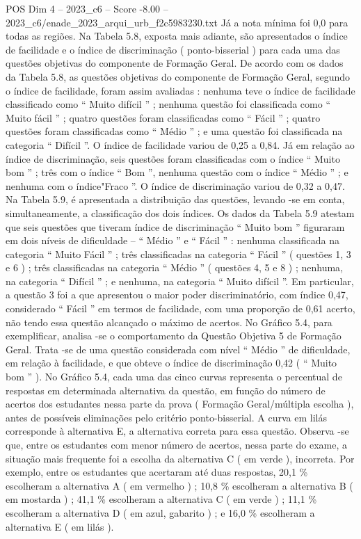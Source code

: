 \begin{textsample}{POS Dim 4 – 2023\_c6 – Score -8.00 – 2023\_c6/enade\_2023\_arqui\_urb\_f2c5983230.txt}
Já a nota mínima foi 0,0 para todas as regiões.
Na Tabela 5.8, exposta mais adiante, são apresentados o índice de facilidade e o índice de discriminação ( ponto-bisserial ) para cada uma das questões objetivas do componente de Formação Geral.
De acordo com os dados da Tabela 5.8, as questões objetivas do componente de Formação Geral, segundo o índice de facilidade, foram assim avaliadas : nenhuma teve o índice de facilidade classificado como “ Muito difícil ” ; nenhuma questão foi classificada como “ Muito fácil ” ; quatro questões foram classificadas como “ Fácil ” ; quatro questões foram classificadas como “ Médio ” ; e uma questão foi classificada na categoria “ Difícil ”.
O índice de facilidade variou de 0,25 a 0,84.
Já em relação ao índice de discriminação, seis questões foram classificadas com o índice “ Muito bom ” ; três com o índice “ Bom ”, nenhuma questão com o índice “ Médio ” ; e nenhuma com o índice"Fraco ”.
O índice de discriminação variou de 0,32 a 0,47.
Na Tabela 5.9, é apresentada a distribuição das questões, levando -se em conta, simultaneamente, a classificação dos dois índices.
Os dados da Tabela 5.9 atestam que seis questões que tiveram índice de discriminação “ Muito bom ” figuraram em dois níveis de dificuldade – “ Médio ” e “ Fácil ” : nenhuma classificada na categoria “ Muito Fácil ” ; três classificadas na categoria “ Fácil ” ( questões 1, 3 e 6 ) ; três classificadas na categoria “ Médio ” ( questões 4, 5 e 8 ) ; nenhuma, na categoria “ Difícil ” ; e nenhuma, na categoria “ Muito difícil ”.
Em particular, a questão 3 foi a que apresentou o maior poder discriminatório, com índice 0,47, considerado “ Fácil ” em termos de facilidade, com uma proporção de 0,61 acerto, não tendo essa questão alcançado o máximo de acertos.
No Gráfico 5.4, para exemplificar, analisa -se o comportamento da Questão Objetiva 5 de Formação Geral.
Trata -se de uma questão considerada com nível “ Médio ” de dificuldade, em relação à facilidade, e que obteve o índice de discriminação 0,42 ( “ Muito bom ” ).
No Gráfico 5.4, cada uma das cinco curvas representa o percentual de respostas em determinada alternativa da questão, em função do número de acertos dos estudantes nessa parte da prova ( Formação Geral/múltipla escolha ), antes de possíveis eliminações pelo critério ponto-bisserial.
A curva em lilás corresponde à alternativa E, a alternativa correta para essa questão.
Observa -se que, entre os estudantes com menor número de acertos, nessa parte do exame, a situação mais frequente foi a escolha da alternativa C ( em verde ), incorreta.
Por exemplo, entre os estudantes que acertaram até duas respostas, 20,1 \% escolheram a alternativa A ( em vermelho ) ; 10,8 \% escolheram a alternativa B ( em mostarda ) ; 41,1 \% escolheram a alternativa C ( em verde ) ; 11,1 \% escolheram a alternativa D ( em azul, gabarito ) ; e 16,0 \% escolheram a alternativa E ( em lilás ).

\end{textsample}
